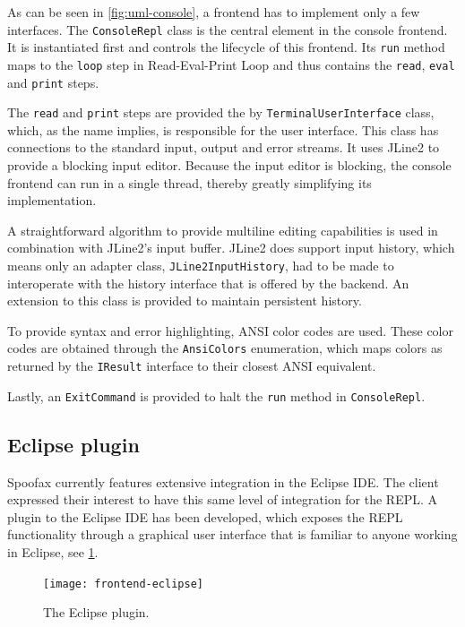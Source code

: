 As can be seen in \cref{fig:uml-console}, a frontend has to implement only a few
interfaces. The \texttt{ConsoleRepl} class is the central element in the
console frontend. It is instantiated first and controls the lifecycle of this
frontend. Its \texttt{run} method maps to the \texttt{loop} step in
Read-Eval-Print Loop and thus contains the \texttt{read}, \texttt{eval} and
\texttt{print} steps.

The \texttt{read} and \texttt{print} steps are provided
the by \texttt{TerminalUserInterface} class, which, as the name implies, is
responsible for the user interface. This class has connections to the standard
input, output and error streams. It uses JLine2 to provide a blocking input
editor. Because the input editor is blocking, the console frontend can run in a
single thread, thereby greatly simplifying its implementation.

A straightforward algorithm to provide multiline editing capabilities is used in
combination with JLine2's input buffer.
JLine2 does support input history, which means only an adapter class,
\texttt{JLine2InputHistory}, had to be made to interoperate with the history
interface that is offered by the backend. An extension to this class is provided
to maintain persistent history.

To provide syntax and error highlighting, ANSI color codes are used. These
color codes are obtained through the \texttt{AnsiColors} enumeration, which
maps colors as returned by the \texttt{IResult} interface to their closest
ANSI equivalent.

Lastly, an \texttt{ExitCommand} is provided to halt the \texttt{run} method
in \texttt{ConsoleRepl}.

\subsection{Eclipse plugin}
\label{ssec:eclipse-plugin}

Spoofax currently features extensive integration in the Eclipse IDE. The client
expressed their interest to have this same level of integration for the REPL. A
plugin to the Eclipse IDE has been developed, which exposes the REPL
functionality through a graphical user interface that is familiar to anyone
working in Eclipse, see \cref{fig:frontend-eclipse}.

\begin{figure}[h]
  \texttt{[image: frontend-eclipse]}
  \caption{The Eclipse plugin.}
  \label{fig:frontend-eclipse}
\end{figure}

